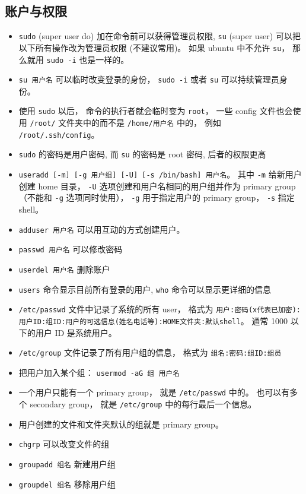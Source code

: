 \subsection{账户与权限}
\begin{itemize}
\item \verb`sudo` (super user do) 加在命令前可以获得管理员权限, \verb`su` (super user) 可以把以下所有操作改为管理员权限 (不建议常用)。 如果 ubuntu 中不允许 \verb`su`， 那么就用 \verb`sudo -i` 也是一样的。
\item \verb`su 用户名` 可以临时改变登录的身份， \verb`sudo -i` 或者 \verb`su` 可以持续管理员身份。
\item 使用 \verb`sudo` 以后， 命令的执行者就会临时变为 \verb`root`， 一些 config 文件也会使用 \verb`/root/` 文件夹中的而不是 \verb`/home/用户名` 中的， 例如 \verb`/root/.ssh/config`。
\item \verb`sudo` 的密码是用户密码, 而 \verb`su` 的密码是 root 密码, 后者的权限更高
\item \verb`useradd [-m] [-g 用户组] [-U] [-s /bin/bash] 用户名`。 其中 \verb`-m` 给新用户创建 home 目录， \verb`-U` 选项创建和用户名相同的用户组并作为 primary group （不能和 \verb`-g` 选项同时使用）， \verb`-g` 用于指定用户的 primary group， \verb`-s` 指定 shell。
\item \verb`adduser 用户名` 可以用互动的方式创建用户。
\item \verb`passwd 用户名` 可以修改密码
\item \verb`userdel 用户名` 删除账户
\item \verb`users` 命令显示目前所有登录的用户, \verb`who` 命令可以显示更详细的信息
\item \verb`/etc/passwd` 文件中记录了系统的所有 user， 格式为 \verb`用户:密码(x代表已加密):用户ID:组ID:用户的可选信息(姓名电话等):HOME文件夹:默认shell`。 通常 1000 以下的用户 ID 是系统用户。
\item \verb`/etc/group` 文件记录了所有用户组的信息， 格式为 \verb`组名:密码:组ID:组员`
\item 把用户加入某个组： \verb`usermod -aG 组 用户名`
\item 一个用户只能有一个 primary group， 就是 \verb`/etc/passwd` 中的。 也可以有多个 secondary group， 就是 \verb`/etc/group` 中的每行最后一个信息。
\item 用户创建的文件和文件夹默认的组就是 primary group。
\item \verb`chgrp` 可以改变文件的组
\item \verb`groupadd 组名` 新建用户组
\item \verb`groupdel 组名` 移除用户组

\end{itemize}
